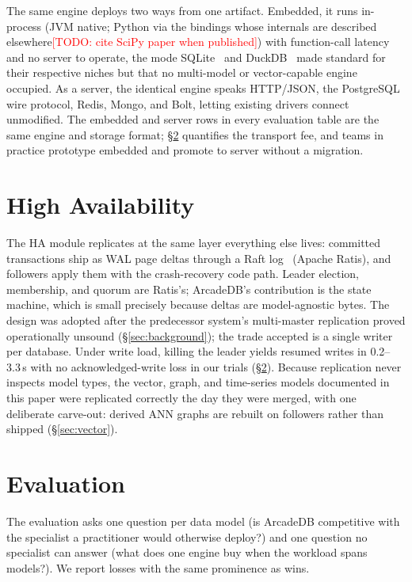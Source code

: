 \documentclass[conference]{IEEEtran}
\newcommand{\todo}[1]{\textcolor{red}{[TODO: #1]}}
\newcommand{\arcadedb}{ArcadeDB}
\begin{document}
The same engine deploys two ways from one artifact. Embedded, it runs
in-process (JVM native; Python via the bindings whose internals are described
elsewhere\todo{cite SciPy paper when published}) with function-call latency
and no server to operate, the mode SQLite~\cite{gaffney2022sqlite} and
DuckDB~\cite{raasveldt-duckdb-cidr} made standard for their respective
niches but that no multi-model or vector-capable engine occupied. As a
server, the identical engine speaks HTTP/JSON, the PostgreSQL wire protocol,
Redis, Mongo, and Bolt, letting existing drivers connect unmodified. The
embedded and server rows in every evaluation table are the same engine and
storage format; \S\ref{sec:eval} quantifies the transport fee, and teams in
practice prototype embedded and promote to server without a migration.

\section{High Availability}\label{sec:ha}

The HA module replicates at the same layer everything else lives: committed
transactions ship as WAL page deltas through a Raft
log~\cite{ongaro2014raft} (Apache Ratis), and followers apply them with the
crash-recovery code path. Leader election, membership, and quorum are
Ratis's; \arcadedb{}'s contribution is the state machine, which is small
precisely because deltas are model-agnostic bytes. The design was adopted
after the predecessor system's multi-master replication proved operationally
unsound (\S\ref{sec:background}); the trade accepted is a single writer per
database. Under write load, killing the leader yields resumed writes in
0.2--3.3\,s with no acknowledged-write loss in our trials
(\S\ref{sec:eval}). Because replication never inspects model types, the
vector, graph, and time-series models documented in this paper were
replicated correctly the day they were merged, with one deliberate carve-out:
derived ANN graphs are rebuilt on followers rather than shipped
(\S\ref{sec:vector}).

\section{Evaluation}\label{sec:eval}

The evaluation asks one question per data model (is \arcadedb{} competitive
with the specialist a practitioner would otherwise deploy?) and one question
no specialist can answer (what does one engine buy when the workload spans
models?). We report losses with the same prominence as wins.
\end{document}
